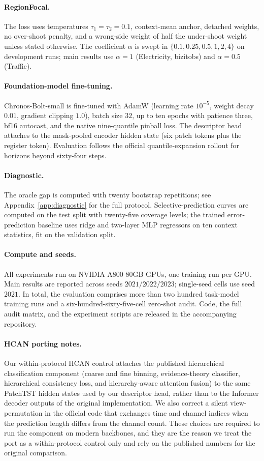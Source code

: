 \paragraph{RegionFocal.}
The loss uses temperatures $\tau_1 = \tau_2 = 0.1$, context-mean anchor, detached weights, no over-shoot penalty, and a wrong-side weight of half the under-shoot weight unless stated otherwise. The coefficient $\alpha$ is swept in $\{0.1, 0.25, 0.5, 1, 2, 4\}$ on development runs; main results use $\alpha = 1$ (Electricity, bizitobs) and $\alpha = 0.5$ (Traffic).

\paragraph{Foundation-model fine-tuning.}
Chronos-Bolt-small is fine-tuned with AdamW (learning rate $10^{-5}$, weight decay $0.01$, gradient clipping $1.0$), batch size $32$, up to ten epochs with patience three, bf16 autocast, and the native nine-quantile pinball loss. The descriptor head attaches to the mask-pooled encoder hidden state (six patch tokens plus the register token). Evaluation follows the official quantile-expansion rollout for horizons beyond sixty-four steps.

\paragraph{Diagnostic.}
The oracle gap is computed with twenty bootstrap repetitions; see Appendix~\ref{app:diagnostic} for the full protocol. Selective-prediction curves are computed on the test split with twenty-five coverage levels; the trained error-prediction baseline uses ridge and two-layer MLP regressors on ten context statistics, fit on the validation split.

\paragraph{Compute and seeds.}
All experiments run on NVIDIA A800 80GB GPUs, one training run per GPU. Main results are reported across seeds $2021/2022/2023$; single-seed cells use seed $2021$. In total, the evaluation comprises more than two hundred task-model training runs and a six-hundred-sixty-five-cell zero-shot audit. Code, the full audit matrix, and the experiment scripts are released in the accompanying repository.

\paragraph{HCAN porting notes.}
Our within-protocol HCAN control attaches the published hierarchical classification component (coarse and fine binning, evidence-theory classifier, hierarchical consistency loss, and hierarchy-aware attention fusion) to the same PatchTST hidden states used by our descriptor head, rather than to the Informer decoder outputs of the original implementation. We also correct a silent view-permutation in the official code that exchanges time and channel indices when the prediction length differs from the channel count. These choices are required to run the component on modern backbones, and they are the reason we treat the port as a within-protocol control only and rely on the published numbers for the original comparison.
